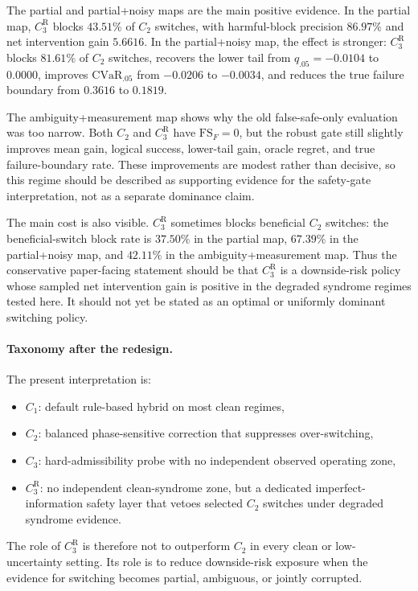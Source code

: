 \documentclass[11pt,a4paper]{article}
\theoremstyle{definition}
\theoremstyle{remark}
\begin{document}
The partial and partial+noisy maps are the main positive evidence.  In the partial
map, $C_3^{\mathrm{R}}$ blocks $43.51\%$ of $C_2$ switches, with harmful-block
precision $86.97\%$ and net intervention gain $5.6616$.  In the partial+noisy map,
the effect is stronger: $C_3^{\mathrm{R}}$ blocks $81.61\%$ of $C_2$ switches,
recovers the lower tail from $q_{.05}=-0.0104$ to $0.0000$, improves
$\mathrm{CVaR}_{.05}$ from $-0.0206$ to $-0.0034$, and reduces the true failure
boundary from $0.3616$ to $0.1819$.

The ambiguity+measurement map shows why the old false-safe-only evaluation was too
narrow.  Both $C_2$ and $C_3^{\mathrm{R}}$ have $\mathrm{FS}_F=0$, but the robust gate
still slightly improves mean gain, logical success, lower-tail gain, oracle regret,
and true failure-boundary rate.  These improvements are modest rather than decisive,
so this regime should be described as supporting evidence for the safety-gate
interpretation, not as a separate dominance claim.

The main cost is also visible.  $C_3^{\mathrm{R}}$ sometimes blocks beneficial $C_2$
switches: the beneficial-switch block rate is $37.50\%$ in the partial map,
$67.39\%$ in the partial+noisy map, and $42.11\%$ in the ambiguity+measurement map.
Thus the conservative paper-facing statement should be that $C_3^{\mathrm{R}}$ is a
downside-risk policy whose sampled net intervention gain is positive in the degraded
syndrome regimes tested here.  It should not yet be stated as an optimal or uniformly
dominant switching policy.

\paragraph{Taxonomy after the redesign.}
The present interpretation is:
\begin{itemize}
\item $C_1$: default rule-based hybrid on most clean regimes,
\item $C_2$: balanced phase-sensitive correction that suppresses over-switching,
\item $C_3$: hard-admissibility probe with no independent observed operating zone,
\item $C_3^{\mathrm{R}}$: no independent clean-syndrome zone, but a dedicated
imperfect-information safety layer that vetoes selected $C_2$ switches under degraded
syndrome evidence.
\end{itemize}
The role of $C_3^{\mathrm{R}}$ is therefore not to outperform $C_2$ in every clean or
low-uncertainty setting.  Its role is to reduce downside-risk exposure when the
evidence for switching becomes partial, ambiguous, or jointly corrupted.
\end{document}
